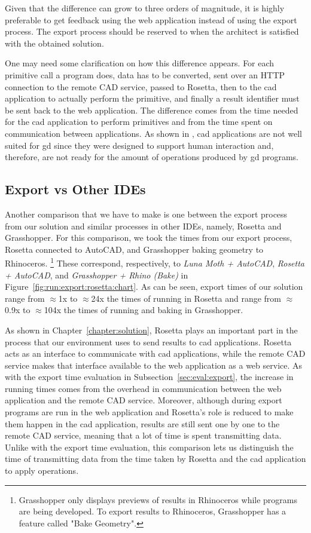 Given that the difference can grow to three orders of magnitude, it is highly preferable to get feedback using the web application instead of using the export process.
The export process should be reserved to when the architect is satisfied with the obtained solution.

One may need some clarification on how this difference appears.
For each primitive call a program does, data has to be converted, sent over an HTTP connection to the remote CAD service, passed to Rosetta, then to the \gls{cad} application to actually perform the primitive, and finally a result identifier must be sent back to the web application.
The difference comes from the time needed for the \gls{cad} application to perform primitives and from the time spent on communication between applications.
As shown in \cite{Leitao2014illustrated}, \gls{cad} applications are not well suited for \gls{gd} since they were designed to support human interaction and, therefore, are not ready for the amount of operations produced by \gls{gd} programs.


\subsection{Export vs Other IDEs}
Another comparison that we have to make is one between the export process from our solution and similar processes in other IDEs, namely, Rosetta and Grasshopper.
For this comparison, we took the times from our export process, Rosetta connected to AutoCAD, and Grasshopper baking geometry to Rhinoceros.%
\footnote{Grasshopper only displays previews of results in Rhinoceros while programs are being developed. To export results to Rhinoceros, Grasshopper has a feature called "Bake Geometry".}
These correspond, respectively, to \textit{Luna Moth + AutoCAD}, \textit{Rosetta + AutoCAD}, and \textit{Grasshopper + Rhino (Bake)} in Figure~\ref{fig:run:export:rosetta:chart}.
As can be seen, export times of our solution range from $\approx$1x to $\approx$24x the times of running in Rosetta and range from $\approx$0.9x to $\approx$104x the times of running and baking in Grasshopper.

As shown in Chapter~\ref{chapter:solution}, Rosetta plays an important part in the process that our environment uses to send results to \gls{cad} applications.
Rosetta acts as an interface to communicate with \gls{cad} applications, while the remote CAD service makes that interface available to the web application as a web service.
As with the export time evaluation in Subsection~\ref{sec:eval:export}, the increase in running times comes from the overhead in communication between the web application and the remote CAD service.
Moreover, although during export programs are run in the web application and Rosetta's role is reduced to make them happen in the \gls{cad} application, results are still sent one by one to the remote CAD service, meaning that a lot of time is spent transmitting data.
Unlike with the export time evaluation, this comparison lets us distinguish the time of transmitting data from the time taken by Rosetta and the \gls{cad} application to apply operations.


